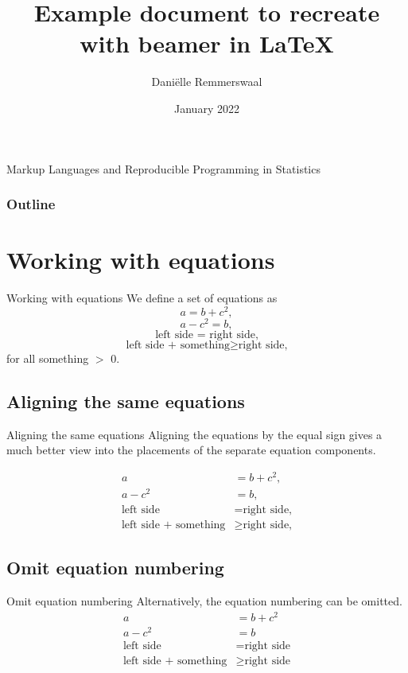 \documentclass[aspectratio=169]{beamer}
\title[]{Example document to recreate with beamer in \LaTeX}
\author{Daniëlle Remmerswaal}
\date[]{January 2022}
\begin{document}
\begin{frame}[b]{}
\titlepage    
    \begin{center}
    Markup Languages and Reproducible Programming in Statistics
    \end{center}
\end{frame}
  
  
  \begin{frame}
\frametitle{Outline}
\tableofcontents

\end{frame}




\section{Working with equations}
\begin{frame}{Working with equations}
We define a set of equations as
\begin{equation}
    a = b + c^2,
\end{equation}
\begin{equation}
    a-c^2=b,
\end{equation}
\begin{equation}
    \mbox{left side = right side,}
\end{equation}
\begin{equation}
    \text{left side + something} \geq \text{right side,}
\end{equation}
for all something $>$ 0.
\end{frame}

\subsection{Aligning the same equations}
\begin{frame}{Aligning the same equations}
Aligning the equations by the equal sign gives a much better view into the placements
of the separate equation components.    

\begin{align}
    a &= b + c^2,
    \\a-c^2&=b,
    \\\mbox{left side} &= \text{right side,}
    \\\text{left side + something} &\geq \text{right side,}
\end{align}
\end{frame}

\subsection{Omit equation numbering}
\begin{frame}{Omit equation numbering}
Alternatively, the equation numbering can be omitted.
\begin{align*}
    a &= b + c^2
    \\a-c^2&=b
    \\\mbox{left side} &= \text{right side}
    \\\text{left side + something} &\geq \text{right side}
\end{align*}
\end{frame}
\end{document}
